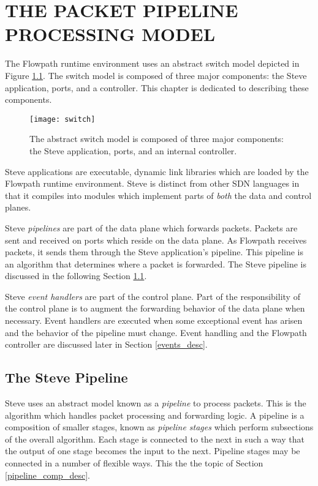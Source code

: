 \chapter{THE PACKET PIPELINE PROCESSING MODEL} \label{ch:pipeline_model}

The Flowpath runtime environment uses an abstract switch model depicted in Figure \ref{fg:abstract_switch}. The switch model is composed of three major components: the Steve application, ports, and a controller. This chapter is dedicated to describing these components.

\begin{figure}[ht]
\texttt{[image: switch]}
\caption{The abstract switch model is composed of three major components: the Steve application, ports, and an internal controller.}
\label{fg:abstract_switch} 
\end{figure}

Steve applications are executable, dynamic link libraries which are loaded by the Flowpath runtime environment. Steve is distinct from other SDN languages in that it compiles into modules which implement parts of \textit{both} the data and control planes. 

Steve \textit{pipelines} are part of the data plane which forwards packets. Packets are sent and received on ports which reside on the data plane. As Flowpath receives packets, it sends them through the Steve application's pipeline. This pipeline is an algorithm that determines where a packet is forwarded. The Steve pipeline is discussed in the following Section \ref{pipeline_desc}.

Steve \textit{event handlers} are part of the control plane. Part of the responsibility of the control plane is to augment the forwarding behavior of the data plane when necessary. Event handlers are executed when some exceptional event has arisen and the behavior of the pipeline must change. Event handling and the Flowpath controller are discussed later in Section \ref{events_desc}.

\section{The Steve Pipeline} \label{pipeline_desc}

Steve uses an abstract model known as a \textit{pipeline} to process packets. This is the algorithm which handles packet processing and forwarding logic. A pipeline is a composition of smaller stages, known as \textit{pipeline stages} which perform subsections of the overall algorithm. Each stage is connected to the next in such a way that the output of
one stage becomes the input to the next. Pipeline stages may be connected in a number of flexible ways. This the the topic of Section \ref{pipeline_comp_desc}. 

